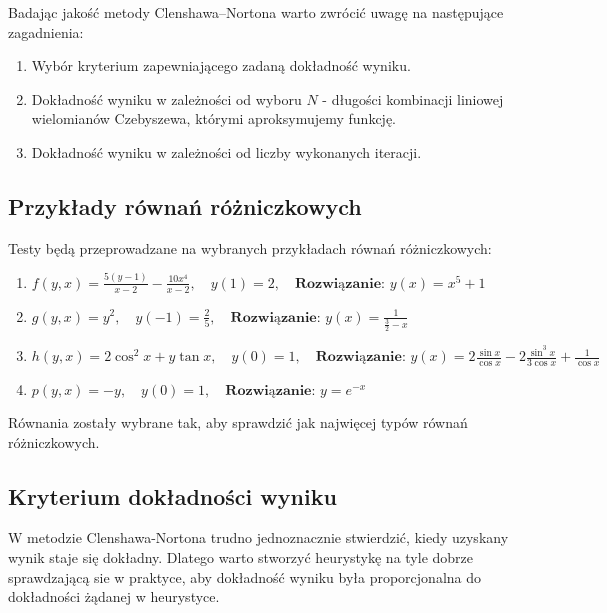 \documentclass{article}
\begin{document}
\par Badając jakość metody Clenshawa--Nortona warto zwrócić uwagę na następujące zagadnienia:
\begin{enumerate}
	\item Wybór kryterium zapewniającego zadaną dokładność wyniku.
	\item Dokładność wyniku w zależności od wyboru $N$ - długości kombinacji liniowej wielomianów Czebyszewa, którymi aproksymujemy funkcję.
	\item Dokładność wyniku w zależności od liczby wykonanych iteracji.
\end{enumerate}

\subsection{Przykłady równań różniczkowych}

Testy będą przeprowadzane na wybranych przykładach równań różniczkowych:
\begin{enumerate}
	\item $ f(y, x) =  \frac{5(y-1)}{x-2} - \frac{10x^4}{x-2}, \quad y(1)=2, \quad \textbf{Rozwiązanie: } y(x) = x^5+1$
	\item $ g(y, x) = y^2, \quad y(-1) =  \frac{2}{5}, \quad \textbf{Rozwiązanie: } y(x) = \frac{1}{\frac{3}{2} -x } $
	\item $ h(y, x) = 2\cos^2{x} + y \tan{x}, \quad y(0)=1, \quad \textbf{Rozwiązanie: } y(x) = 
			2\frac{ \sin{x} }{ \cos{x} } - 2 \frac{ \sin^3{x} }{ 3\cos{x} } + \frac{1}{ \cos{x} } $
	\item $ p(y, x) = -y, \quad y(0) = 1, \quad \textbf{Rozwiązanie: } y = e^{-x}$
\end{enumerate}

Równania zostały wybrane tak, aby sprawdzić jak najwięcej typów równań różniczkowych.

\subsection{Kryterium dokładności wyniku}
	\label{sub:kryterium}

\par W metodzie Clenshawa-Nortona trudno jednoznacznie stwierdzić, kiedy uzyskany wynik staje się dokładny. Dlatego warto stworzyć heurystykę na tyle dobrze sprawdzającą sie w praktyce, aby dokładność wyniku była proporcjonalna do dokładności żądanej w heurystyce.
\end{document}

